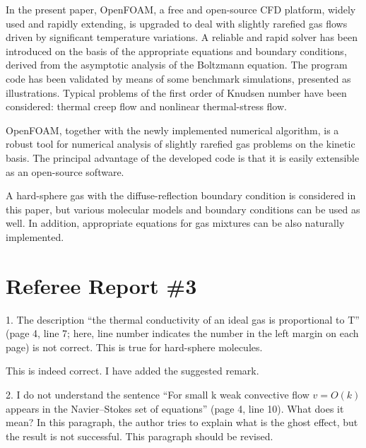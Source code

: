 \documentclass{article}
\begin{document}
\begin{leftbar}
In the present paper, OpenFOAM\textregistered{}, a free and open-source CFD platform,
widely used and rapidly extending, is upgraded to deal with
slightly rarefied gas flows driven by significant temperature variations.
A reliable and rapid solver has been introduced on the basis of the appropriate
equations and boundary conditions, derived from the asymptotic analysis of the Boltzmann equation.
The program code has been validated by means of some benchmark simulations,
presented as illustrations. Typical problems of the first order of Knudsen number
have been considered: thermal creep flow and nonlinear thermal-stress flow.

OpenFOAM\textregistered{}, together with the newly implemented numerical algorithm,
is a robust tool for numerical analysis of slightly rarefied gas problems
on the kinetic basis. The principal advantage of the developed code is that
it is easily extensible as an open-source software.

A hard-sphere gas with the diffuse-reflection boundary condition is considered in this paper,
but various molecular models and boundary conditions can be used as well.
In addition, appropriate equations for gas mixtures can be also naturally implemented.
\end{leftbar}

\section{Referee Report \#3}

\begin{quoting}
1. The description ``the thermal conductivity of an ideal gas is
proportional to T'' (page 4, line 7; here, line number indicates the
number in the left margin on each page) is not correct. This is true for
hard-sphere molecules.
\end{quoting}

This is indeed correct. I have added the suggested remark.

\begin{quoting}
2. I do not understand the sentence ``For small k weak convective flow \(v
= O(k)\) appears in the Navier--Stokes set of equations'' (page 4, line 10).
What does it mean? In this paragraph, the author tries to explain what
is the ghost effect, but the result is not successful. This paragraph
should be revised.
\end{quoting}
\end{document}
